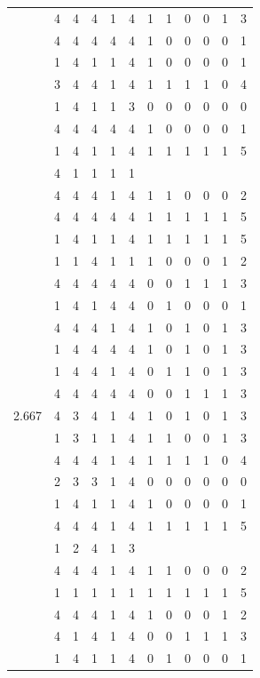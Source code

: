 \documentclass[]{book}
\theoremstyle{definition}
\theoremstyle{definition}
\theoremstyle{definition}
\theoremstyle{remark}
\begin{document}
\begin{table}
{\begin{tabular}[t]{rrrrrrrrrrrr}
 & 4 & 4 & 4 & 1 & 4 & 1 & 1 & 0 & 0 & 1 & 3\\
 & 4 & 4 & 4 & 4 & 4 & 1 & 0 & 0 & 0 & 0 & 1\\
 & 1 & 4 & 1 & 1 & 4 & 1 & 0 & 0 & 0 & 0 & 1\\
 & 3 & 4 & 4 & 1 & 4 & 1 & 1 & 1 & 1 & 0 & 4\\
 & 1 & 4 & 1 & 1 & 3 & 0 & 0 & 0 & 0 & 0 & 0\\
 & 4 & 4 & 4 & 4 & 4 & 1 & 0 & 0 & 0 & 0 & 1\\
 & 1 & 4 & 1 & 1 & 4 & 1 & 1 & 1 & 1 & 1 & 5\\
 & 4 & 1 & 1 & 1 & 1 &  &  &  &  &  & \\
 & 4 & 4 & 4 & 1 & 4 & 1 & 1 & 0 & 0 & 0 & 2\\
 & 4 & 4 & 4 & 4 & 4 & 1 & 1 & 1 & 1 & 1 & 5\\
 & 1 & 4 & 1 & 1 & 4 & 1 & 1 & 1 & 1 & 1 & 5\\
 & 1 & 1 & 4 & 1 & 1 & 1 & 0 & 0 & 0 & 1 & 2\\
 & 4 & 4 & 4 & 4 & 4 & 0 & 0 & 1 & 1 & 1 & 3\\
 & 1 & 4 & 1 & 4 & 4 & 0 & 1 & 0 & 0 & 0 & 1\\
 & 4 & 4 & 4 & 1 & 4 & 1 & 0 & 1 & 0 & 1 & 3\\
 & 1 & 4 & 4 & 4 & 4 & 1 & 0 & 1 & 0 & 1 & 3\\
 & 1 & 4 & 4 & 1 & 4 & 0 & 1 & 1 & 0 & 1 & 3\\
 & 4 & 4 & 4 & 4 & 4 & 0 & 0 & 1 & 1 & 1 & 3\\
2.667 & 4 & 3 & 4 & 1 & 4 & 1 & 0 & 1 & 0 & 1 & 3\\
 & 1 & 3 & 1 & 1 & 4 & 1 & 1 & 0 & 0 & 1 & 3\\
 & 4 & 4 & 4 & 1 & 4 & 1 & 1 & 1 & 1 & 0 & 4\\
 & 2 & 3 & 3 & 1 & 4 & 0 & 0 & 0 & 0 & 0 & 0\\
 & 1 & 4 & 1 & 1 & 4 & 1 & 0 & 0 & 0 & 0 & 1\\
 & 4 & 4 & 4 & 1 & 4 & 1 & 1 & 1 & 1 & 1 & 5\\
 & 1 & 2 & 4 & 1 & 3 &  &  &  &  &  & \\
 & 4 & 4 & 4 & 1 & 4 & 1 & 1 & 0 & 0 & 0 & 2\\
 & 1 & 1 & 1 & 1 & 1 & 1 & 1 & 1 & 1 & 1 & 5\\
 & 4 & 4 & 4 & 1 & 4 & 1 & 0 & 0 & 0 & 1 & 2\\
 & 4 & 1 & 4 & 1 & 4 & 0 & 0 & 1 & 1 & 1 & 3\\
 & 1 & 4 & 1 & 1 & 4 & 0 & 1 & 0 & 0 & 0 & 1\\

\end{tabular}}
\end{table}
\end{document}

